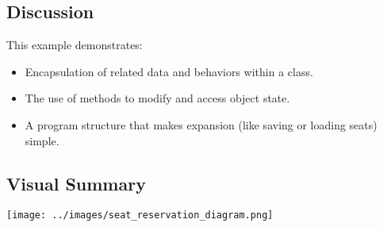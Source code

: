 \subsection*{Discussion}
This example demonstrates:
\begin{itemize}
    \item Encapsulation of related data and behaviors within a class.
    \item The use of methods to modify and access object state.
    \item A program structure that makes expansion (like saving or loading seats) simple.
\end{itemize}

\subsection*{Visual Summary}
\begin{center}
    \texttt{[image: ../images/seat\_reservation\_diagram.png]}
\end{center}

